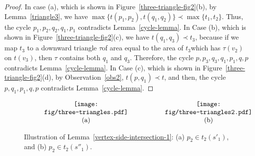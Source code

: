\documentclass[11pt,a4paper]{article}
\begin{document}
\begin{proof}
In case (a), which is shown in Figure~\ref{three-triangle-fig2}(b), by Lemma~\ref{triangle3}, we have $\max\{t(p_1,p_2),t(q_1,q_2)\}\prec\max\{t_1,t_2\}$. Thus, the cycle $p_1,p_2,q_2,q_1,p_1$ contradicts Lemma~\ref{cycle-lemma}. In Case (b), which is shown in Figure~\ref{three-triangle-fig2}(c), we have $t(q_1,q_3)\prec t_3$, because if we map $t_3$ to a downward triangle $\tau$\textemdash of area equal to the area of $t_3$\textemdash which has $\tau(v_2)$ on $t(v_3)$, then $\tau$ contains both $q_1$ and $q_3$. Therefore, the cycle $p,p_3,q_3,q_1,p_1,q,p$ contradicts Lemma~\ref{cycle-lemma}. In Case (c), which is shown in Figure~\ref{three-triangle-fig2}(d), by Observation~\ref{obs2}, $t(p,q_1)\prec t$, and then, the cycle $p,q_1,p_1,q,p$ contradicts Lemma~\ref{cycle-lemma}.
\end{proof}

\begin{figure}[htb]
  \centering
\setlength{\tabcolsep}{0in}
  $\begin{tabular}{cc}
\multicolumn{1}{m{.5\columnwidth}}{\centering\texttt{[image: fig/three-triangles.pdf]}}
&\multicolumn{1}{m{.5\columnwidth}}{\centering\texttt{[image: fig/three-triangles2.pdf]}} \\
(a) & (b)
\end{tabular}$
  \caption{Illustration of Lemma~\ref{vertex-side-intersection-1}: (a) $p_2\in t_2(s'_1)$, and (b) $p_2\in t_2(s''_1)$.}
\label{three-triangle-fig}
\end{figure}
\end{document}

